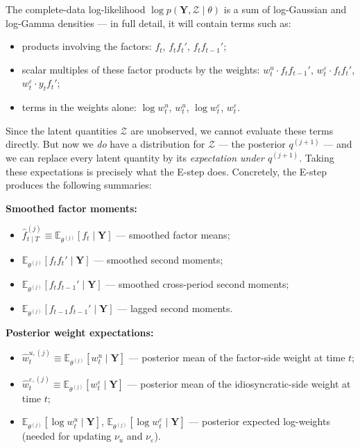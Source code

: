 \documentclass[11pt, a4paper, oneside]{article}
\newcommand{\mY}{\mathbf{Y}}
\begin{document}
The complete-data log-likelihood $\log p(\mY, \mathcal{Z} \mid \theta)$ is
a sum of log-Gaussian and log-Gamma densities — in full detail, it will
contain terms such as:
\begin{itemize}[leftmargin=1.5em, itemsep=3pt]
    \item products involving the factors: $f_t$, $f_t f_t'$,
          $f_t f_{t-1}'$;
    \item scalar multiples of these factor products by the weights:
          $w^u_t \cdot f_t f_{t-1}'$, $w^\varepsilon_t \cdot f_t f_t'$,
          $w^\varepsilon_t \cdot y_t f_t'$;
    \item terms in the weights alone: $\log w^u_t$, $w^u_t$,
          $\log w^\varepsilon_t$, $w^\varepsilon_t$.
\end{itemize}
Since the latent quantities $\mathcal{Z}$ are unobserved, we cannot
evaluate these terms directly. But now we \emph{do} have a distribution
for $\mathcal{Z}$ — the posterior $q^{(j+1)}$ — and we can replace
every latent quantity by its \emph{expectation under $q^{(j+1)}$}. Taking
these expectations is precisely what the E-step does. Concretely, the
E-step produces the following summaries:

\medskip

\noindent\textbf{Smoothed factor moments:}
\begin{itemize}[leftmargin=1.5em, itemsep=2pt]
    \item $\hat{f}_{t \mid T}^{(j)} \equiv \mathbb{E}_{\theta^{(j)}}[f_t \mid \mY]$
          — smoothed factor means;
    \item $\mathbb{E}_{\theta^{(j)}}[f_t f_t' \mid \mY]$ — smoothed second
          moments;
    \item $\mathbb{E}_{\theta^{(j)}}[f_t f_{t-1}' \mid \mY]$ — smoothed
          cross-period second moments;
    \item $\mathbb{E}_{\theta^{(j)}}[f_{t-1} f_{t-1}' \mid \mY]$ — lagged
          second moments.
\end{itemize}

\noindent\textbf{Posterior weight expectations:}
\begin{itemize}[leftmargin=1.5em, itemsep=2pt]
    \item $\hat{w}^{u,(j)}_t \equiv \mathbb{E}_{\theta^{(j)}}[w^u_t \mid \mY]$ —
          posterior mean of the factor-side weight at time $t$;
    \item $\hat{w}^{\varepsilon,(j)}_t \equiv \mathbb{E}_{\theta^{(j)}}[w^\varepsilon_t \mid \mY]$ —
          posterior mean of the idiosyncratic-side weight at time $t$;
    \item $\mathbb{E}_{\theta^{(j)}}[\log w^u_t \mid \mY]$,
          $\mathbb{E}_{\theta^{(j)}}[\log w^\varepsilon_t \mid \mY]$ —
          posterior expected log-weights (needed for updating $\nu_u$
          and $\nu_\varepsilon$).
\end{itemize}
\end{document}
